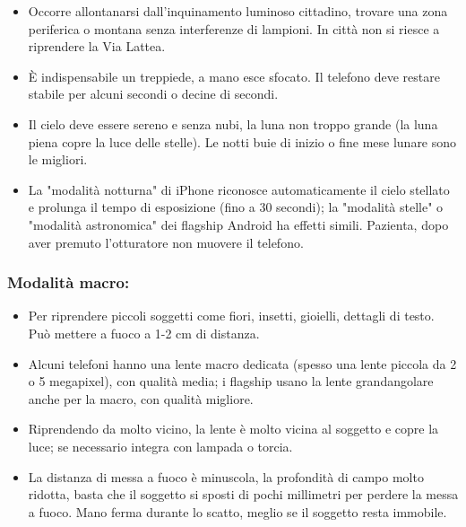 \begin{itemize}
  \item Occorre allontanarsi dall'inquinamento luminoso cittadino, trovare una zona periferica o montana senza interferenze di lampioni. In città non si riesce a riprendere la Via Lattea.
  \item È indispensabile un treppiede, a mano esce sfocato. Il telefono deve restare stabile per alcuni secondi o decine di secondi.
  \item Il cielo deve essere sereno e senza nubi, la luna non troppo grande (la luna piena copre la luce delle stelle). Le notti buie di inizio o fine mese lunare sono le migliori.
  \item La "modalità notturna" di iPhone riconosce automaticamente il cielo stellato e prolunga il tempo di esposizione (fino a 30 secondi); la "modalità stelle" o "modalità astronomica" dei flagship Android ha effetti simili. Pazienta, dopo aver premuto l'otturatore non muovere il telefono.
\end{itemize}

\subsubsection*{Modalità macro:}

\begin{itemize}
  \item Per riprendere piccoli soggetti come fiori, insetti, gioielli, dettagli di testo. Può mettere a fuoco a 1-2 cm di distanza.
  \item Alcuni telefoni hanno una lente macro dedicata (spesso una lente piccola da 2 o 5 megapixel), con qualità media; i flagship usano la lente grandangolare anche per la macro, con qualità migliore.
  \item Riprendendo da molto vicino, la lente è molto vicina al soggetto e copre la luce; se necessario integra con lampada o torcia.
  \item La distanza di messa a fuoco è minuscola, la profondità di campo molto ridotta, basta che il soggetto si sposti di pochi millimetri per perdere la messa a fuoco. Mano ferma durante lo scatto, meglio se il soggetto resta immobile.
\end{itemize}


